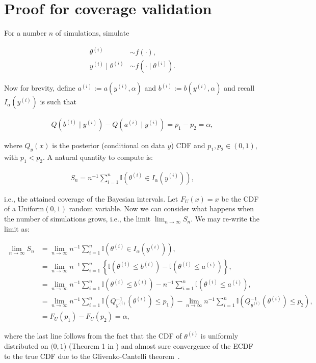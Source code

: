 \documentclass[oneside]{article}
\begin{document}
\newpage
\section{Proof for coverage validation}

For a number $n$ of simulations, simulate

\begin{align*}
\theta^{(i)} &\sim f(\cdot), \\
y^{(i)} \mid \theta^{(i)} &\sim f(\cdot \mid \theta^{(i)}).
\end{align*}

Now  for brevity, define $a^{(i)} := a(y^{(i)}, \alpha)$ and $b^{(i)} := b(y^{(i)}, \alpha)$ and recall $I_{\alpha}\left(y^{(i)}\right)$ is such that 

\begin{align*}
Q\left(b^{(i)} \mid y^{(i)}\right) - Q\left(a^{(i)} \mid y^{(i)}\right) = p_1 - p_2 = \alpha,
\end{align*}

\noindent where $Q_{y}(x)$ is the posterior (conditional on data $y$) CDF and $p_1, p_2 \in (0,1)$, with $p_1 < p_2$.
A natural quantity to compute is:

\begin{align*}
S_n = n^{-1}\sum_{i=1}^n \mathbb{I}\left(\theta^{(i)} \in I_{\alpha}\left(y^{(i)}\right) \right),
\end{align*}

\noindent i.e., the attained coverage of the Bayesian intervals.
Let $F_U(x) = x$ be the CDF of a $\operatorname{Uniform(0, 1)}$ random variable. 
Now we can consider what happens when the number of simulations grows, i.e., the limit $\lim_{n \to \infty} S_n$.
We may re-write the limit as:

\begin{align*}
\lim_{n \to \infty} S_n &= \lim_{n \to \infty} n^{-1}\sum_{i=1}^n \mathbb{I}\left(\theta^{(i)} \in I_{\alpha}\left(y^{(i)}\right) \right),\\
&=  \lim_{n \to \infty} n^{-1}\sum_{i=1}^n \left\{ \mathbb{I}\left(\theta^{(i)} \leq b^{(i)} \right) - \mathbb{I}\left(\theta^{(i)} \leq a^{(i)} \right) \right\},\\
&=  \lim_{n \to \infty} n^{-1}\sum_{i=1}^n \mathbb{I}\left(\theta^{(i)} \leq b^{(i)} \right) -  n^{-1}\sum_{i=1}^n\mathbb{I}\left(\theta^{(i)} \leq a^{(i)} \right),\\
&=  \lim_{n \to \infty} n^{-1}\sum_{i=1}^n \mathbb{I}\left(Q_{y^{(i)}}^{-1}\left(\theta^{(i)}\right) \leq p_1 \right) -   \lim_{n \to \infty} n^{-1}\sum_{i=1}^n\mathbb{I}\left(Q_{y^{(i)}}^{-1}\left(\theta^{(i)}\right) \leq p_2 \right),\\
&= F_U(p_1) - F_U(p_2) = \alpha,
\end{align*}

\noindent where the last line follows from the fact that the CDF of $\theta^{(i)}$ is uniformly distributed on $(0, 1$) (Theorem 1 in \cite{Cook2006}) and almost sure convergence of the ECDF to the true CDF due to the  Glivenko-Cantelli theorem~\cite[page 275]{Billingsley1986}.

\end{document}
